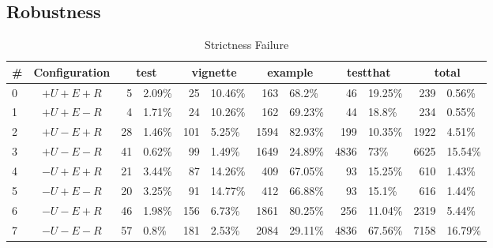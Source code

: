 \documentclass[review,nonacm,screen,acmsmall,anonymous=true]{acmart}
\newcommand{\authorcomment}[3]{}
\newcommand{\AG}[1]{\authorcomment{orange}{AG}{#1}}
\begin{document}
\subsection{Robustness} \label{Evaluation:Robustness}

\AG{add evaluation orders and contrast with side effects to assess impact.}

%

\begin{table}
  \small
  \caption{Strictness Failure} \label{table:strictfail}
  \centering
  \begin{tabular}{lc|rl|rl|rl|rl|rl}
    \toprule
    \#&\textbf{Configuration}&\multicolumn{2}{c}{\textbf{test}}&\multicolumn{2}{c}{\textbf{vignette}}&\multicolumn{2}{c}{\textbf{example}}&\multicolumn{2}{c}{\textbf{testthat}}&\multicolumn{2}{c}{\textbf{total}}\\
    \midrule
    0&$+U+E+R$&5&2.09\%&25&10.46\%&163&68.2\%&46&19.25\%&239&0.56\%\\
    1&$+U+E-R$&4&1.71\%&24&10.26\%&162&69.23\%&44&18.8\%&234&0.55\%\\
    2&$+U-E+R$&28&1.46\%&101&5.25\%&1594&82.93\%&199&10.35\%&1922&4.51\%\\
    3&$+U-E-R$&41&0.62\%&99&1.49\%&1649&24.89\%&4836&73\%&6625&15.54\%\\
    4&$-U+E+R$&21&3.44\%&87&14.26\%&409&67.05\%&93&15.25\%&610&1.43\%\\
    5&$-U+E-R$&20&3.25\%&91&14.77\%&412&66.88\%&93&15.1\%&616&1.44\%\\
    6&$-U-E+R$&46&1.98\%&156&6.73\%&1861&80.25\%&256&11.04\%&2319&5.44\%\\
    7&$-U-E-R$&57&0.8\%&181&2.53\%&2084&29.11\%&4836&67.56\%&7158&16.79\%\\
    \bottomrule
  \end{tabular}
\end{table}
\end{document}
